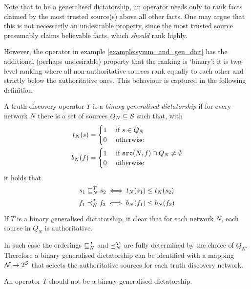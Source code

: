 \documentclass[../main.tex]{subfiles}
\begin{document}
Note that to be a generalised dictatorship, an operator needs only to rank
facts claimed by the most trusted source(s) above all other facts. One may
argue that this is not necessarily an undesirable property, since the most
trusted source presumably claims believable facts, which \emph{should} rank
highly.

However, the operator in example \ref{example:symm_and_gen_dict} has the
additional (perhaps undesirable) property that the ranking is `binary': it is
two-level ranking where all non-authoritative sources rank equally to each
other and strictly below the authoritative ones. This behaviour is captured in
the following definition.

\begin{definition}
A truth discovery operator $T$ is a \emph{binary generalised dictatorship} if
for every network $N$ there is a set of sources $Q_N \subseteq \S$ such that,
with
\begin{align*}
    t_N(s) & = \begin{cases}
        1 & \text{ if } s \in Q_N \\
        0 & \text{ otherwise}
    \end{cases} \\
    b_N(f) & = \begin{cases}
        1 & \text{ if } \src(N, f) \cap Q_N \ne \emptyset \\
        0 & \text{ otherwise}
    \end{cases}
\end{align*}
it holds that
\[ s_1 \sle_N^T s_2 \iff t_N(s_1) \le t_N(s_2) \]
\[ f_1 \fle_N^T f_2 \iff b_N(f_1) \le b_N(f_2) \]

\end{definition}

\begin{remark}
If $T$ is a binary generalised dictatorship, it clear that for each network
$N$, each source in $Q_N$ is authoritative.

In such case the orderings $\sle_N^T$ and $\fle_N^T$ are fully determined by
the choice of $Q_N$. Therefore a binary generalised dictatorship can be
identified with a mapping $\N \rightarrow 2^\S$ that selects the authoritative
sources for each truth discovery network.
\end{remark}

\begin{axiom}
\label{axiom:non_bin_gen_dict}
An operator $T$ should not be a binary generalised dictatorship.
\end{axiom}
\end{document}

